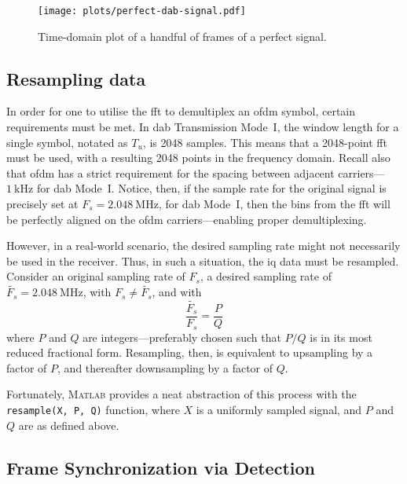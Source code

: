 \documentclass[class=report,11pt,crop=false]{standalone}
\begin{document}
\begin{figure}[htbp]
  \centering
  \captionsetup{type=figure}
  \texttt{[image: plots/perfect-dab-signal.pdf]}
  \caption{Time-domain plot of a handful of frames of a perfect  signal.}
  \label{fig:plots/perfect-dab-signal}
\end{figure}

\subsection{Resampling  data \label{subsect:dab-proc_iq-resample}}
In order for one to utilise the \gls{fft} to demultiplex an \gls{ofdm} symbol, certain requirements must be met. In \gls{dab} Transmission Mode~I, the window length for a single symbol, notated as \(T_u\), is 2048 samples. This means that a 2048-point \gls{fft} must be used, with a resulting 2048 points in the frequency domain. Recall also that \gls{ofdm} has a strict requirement for the spacing between adjacent carriers---\(\SI{1}{\kilo \hertz}\) for \gls{dab} Mode~I. Notice, then, if the sample rate for the original signal is precisely set at \(F_s = \SI{2.048}{\mega \hertz}\), for \gls{dab} Mode~I, then the bins from the \gls{fft} will be perfectly aligned on the \gls{ofdm} carriers---enabling proper demultiplexing.

However, in a real-world scenario, the desired sampling rate might not necessarily be used in the receiver. Thus, in such a situation, the \gls{iq} data must be resampled. Consider an original sampling rate of \(F_s\), a desired sampling rate of \(\tilde{F_s} = \SI{2.048}{\mega \hertz}\), with \(F_s \ne \tilde{F_s}\), and with
\begin{equation}
  \frac{\tilde{F_s}}{F_s} = \frac{P}{Q}
\end{equation}
where \(P\) and \(Q\) are integers---preferably chosen such that \(P/Q\) is in its most reduced fractional form. Resampling, then, is equivalent to upsampling by a factor of \(P\), and thereafter downsampling by a factor of \(Q\).

Fortunately, \textsc{Matlab} provides a neat abstraction of this process with the \texttt{resample(X, P, Q)} function, where \(X\) is a uniformly sampled signal, and \(P\) and \(Q\) are as defined above.

\subsection{Frame Synchronization via  Detection \label{subsect:dab-proc_prs-detect}}
\end{document}

